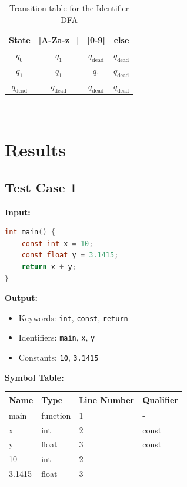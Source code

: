 \documentclass[12pt,a4paper]{article}
\begin{document}
\begin{table}[h]
\centering
\begin{tabular}{c|c|c|c}
\textbf{State} & \textbf{[A-Za-z\_]} & \textbf{[0-9]} & \textbf{else} \\
\hline
$q_0$ & $q_1$ & $q_{\text{dead}}$ & $q_{\text{dead}}$ \\
$q_1$ & $q_1$ & $q_1$ & $q_{\text{dead}}$ \\
$q_{\text{dead}}$ & $q_{\text{dead}}$ & $q_{\text{dead}}$ & $q_{\text{dead}}$ \\
\end{tabular}
\caption{Transition table for the Identifier DFA}\\[5cm]
\end{table}

\section{Results}

\subsection*{Test Case 1}
\textbf{Input:}
\begin{lstlisting}[language=C]
int main() {
    const int x = 10;
    const float y = 3.1415;
    return x + y;
}
\end{lstlisting}

\textbf{Output:}
\begin{itemize}
    \item Keywords: \texttt{int}, \texttt{const}, \texttt{return}
    \item Identifiers: \texttt{main}, \texttt{x}, \texttt{y}
    \item Constants: \texttt{10}, \texttt{3.1415}
\end{itemize}

\textbf{Symbol Table:}
\begin{tabularx}{\linewidth}{|l|l|l|l|}
\hline
\textbf{Name} & \textbf{Type} & \textbf{Line Number} & \textbf{Qualifier} \\
\hline
main & function & 1 & - \\
x & int & 2 & const \\
y & float & 3 & const \\
10 & int & 2 & - \\
3.1415 & float & 3 & - \\
\hline
\end{tabularx}
\end{document}
